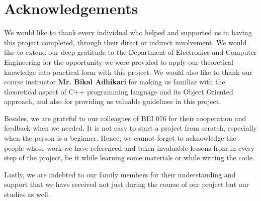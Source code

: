 \documentclass[main]{subfiles}
\begin{document}
\chapter*{\centering Acknowledgements}

We would like to thank every individual who helped and supported us in having this project completed, through their direct or indirect involvement. We would like to extend our deep gratitude to the Department of Electronics and Computer Engineering for the opportunity we were provided to apply our theoretical knowledge into practical form with this project. We would also like to thank our course instructor \textbf{Mr. Bikal Adhikari} for making us familiar with the theoretical aspect of C++ programming language and its Object Oriented approach, and also for providing us valuable guidelines in this project.

Besides, we are grateful to our colleagues of BEI 076 for their cooperation and feedback when we needed. It is not easy to start a project from scratch, especially when the person is a beginner. Hence, we cannot forget to acknowledge the people whose work we have referenced and taken invaluable lessons from in every step of the project, be it while learning some materials or while writing the code.

Lastly, we are indebted to our family members for their understanding and support that we have received not just during the course of our project but our studies as well.
\end{document}

